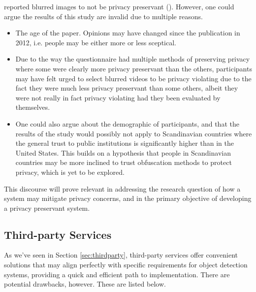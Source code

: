 \citeauthor{ed2012privacy_review} reported blurred images to not be privacy preservant (\citeauthor{ed2012privacy_review}). However, one could argue the results of this study are invalid due to multiple reasons. 
\begin{itemize}
    \item The age of the paper. Opinions may have changed since the publication in 2012, i.e. people may be either more or less sceptical.  
    \item Due to the way the questionnaire had multiple methods of preserving privacy where some were clearly more privacy preservant than the others, participants may have felt urged to select blurred videos to be privacy violating due to the fact they were much less privacy preservant than some others, albeit they were not really in fact privacy violating had they been evaluated by themselves.
    \item One could also argue about the demographic of participants, and that the results of the study would possibly not apply to Scandinavian countries where the general trust to public institutions is significantly higher than in the United States. This builds on a hypothesis that people in Scandinavian countries may be more inclined to trust obfuscation methods to protect privacy, which is yet to be explored. 
\end{itemize}

This discourse will prove relevant in addressing the research question of how a system may mitigate privacy concerns, and in the primary objective of developing a privacy preservant system.

\subsection{Third-party Services}
\label{sec:discuss_thirdparty}
As we've seen in Section \ref{sec:thirdparty}, third-party services offer convenient solutions that may align perfectly with specific requirements for object detection systems, providing a quick and efficient path to implementation. There are potential drawbacks, however. These are listed below.

